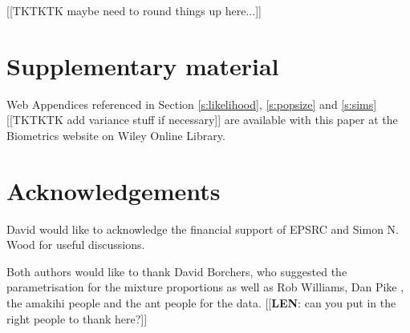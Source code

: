 \documentclass[useAMS,referee]{biom}
\begin{document}
[[TKTKTK maybe need to round things up here...]]


\backmatter


\section*{Supplementary material}

Web Appendices referenced in Section \ref{s:likelihood}, \ref{s:popsize} and \ref{s:sims} [[TKTKTK add variance stuff if necessary]] are available with this paper at the Biometrics website on Wiley Online Library.

\section*{Acknowledgements}

David would like to acknowledge the financial support of EPSRC and Simon N. Wood for useful discussions.

Both authors would like to thank David Borchers, who suggested the parametrisation for the mixture proportions as well as Rob Williams, Dan Pike , the amakihi people and the ant people for the data. [[\textbf{LEN}: can you put in the right people to thank here?]]



\end{document}
